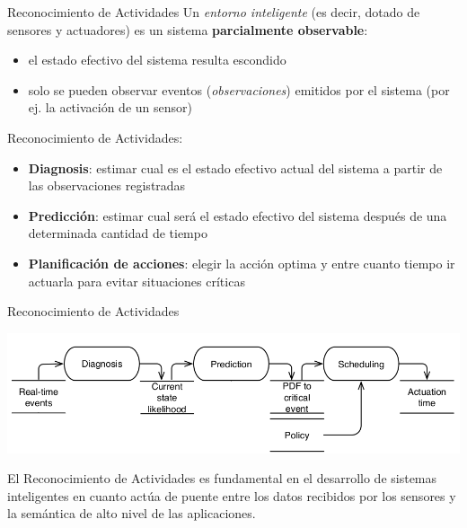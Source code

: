 \documentclass[9pt, handout]{beamer}
\begin{document}
    \begin{frame}{Reconocimiento de Actividades}
      \pause
      Un \textit{entorno inteligente} (es decir, dotado de sensores y actuadores) es un sistema \textbf{parcialmente observable}:
      \pause
      \begin{itemize}
        \item el estado efectivo del sistema resulta escondido
        \pause
        \item solo se pueden observar eventos (\textit{observaciones}) emitidos por el sistema (por ej. la activación de un sensor)\\[1em]
      \end{itemize}
      
      \pause
      
      Reconocimiento de Actividades:
      \pause
      \begin{itemize}
        \item \textbf{Diagnosis}: estimar cual es el estado efectivo actual del sistema a partir de las observaciones registradas
        \pause
        \item \textbf{Predicción}: estimar cual será el estado efectivo del sistema después de una determinada cantidad de tiempo
        \item \textbf{Planificación de acciones}: elegir la acción optima y entre cuanto tiempo ir actuarla para evitar situaciones críticas\\[1em]
      \end{itemize}
    \end{frame}
    
    \begin{frame}{Reconocimiento de Actividades}
      \begin{center}
        \includegraphics[scale=0.35]{img/diag_pred_sched_chain_general.png}
      \end{center}
      
      \pause
            
      El Reconocimiento de Actividades es fundamental en el desarrollo de sistemas inteligentes en cuanto actúa de puente entre los datos recibidos por los sensores y la semántica de alto nivel de las aplicaciones.
    \end{frame}
    
\end{document}
